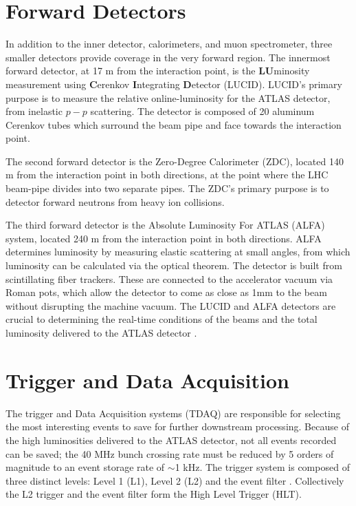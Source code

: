\section{Forward Detectors}
	In addition to the inner detector, calorimeters, and muon spectrometer, three smaller detectors provide coverage in the very forward region. The innermost forward detector, at 17 m from the interaction point, is the \textbf{LU}minosity measurement using \textbf{C}erenkov \textbf{I}ntegrating \textbf{D}etector (LUCID). LUCID's primary purpose is to measure the relative online-luminosity for the ATLAS detector, from inelastic $p-p$ scattering. The detector is composed of 20 aluminum Cerenkov tubes which surround the beam pipe and face towards the interaction point. \par
	The second forward detector is the Zero-Degree Calorimeter (ZDC), located 140 m from the interaction point in both directions, at the point where the LHC beam-pipe divides into two separate pipes. The ZDC's primary purpose is to detector forward neutrons from heavy ion collisions. \par
	The third forward detector is the Absolute Luminosity For ATLAS (ALFA) system, located 240 m from the interaction point in both directions. ALFA determines luminosity by measuring elastic scattering at small angles, from which luminosity can be calculated via the optical theorem. The detector is built from scintillating fiber trackers. These are connected to the accelerator vacuum via Roman pots, which allow the detector to come as close as 1mm to the beam without disrupting the machine vacuum. The LUCID and ALFA detectors are crucial to determining the real-time conditions of the beams and the total luminosity delivered to the ATLAS detector  \cite{atlas_overview}.

\section{Trigger and Data Acquisition}
	The trigger and Data Acquisition systems (TDAQ) are responsible for selecting the most interesting events to save for further downstream processing. Because of the high luminosities delivered to the ATLAS detector, not all events recorded can be saved; the 40 MHz bunch crossing rate must be reduced by 5 orders of magnitude to an event storage rate of $\sim$1 kHz. The trigger system is composed of three distinct levels: Level 1 (L1), Level 2 (L2) and the event filter \cite{atlas_overview}. Collectively the L2 trigger and the event filter form the High Level Trigger (HLT).  \par

